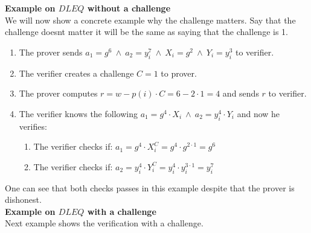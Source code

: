 \noindent
\textbf{Example on $DLEQ$ without a challenge}\\
We will now show a concrete example why the challenge matters. Say that the challenge doesnt matter it will be the same as saying that the challenge is 1. 


\begin{enumerate}
    \item The prover sends \begin{math}a_1=g^6 \ \land\ a_2=y_i^7 \ \land \ X_i=g^2 \ \land \ Y_i=y_i^3 \end{math} to verifier.
    \item The verifier creates a challenge \begin{math}C=1 \end{math} to prover.
    \item The prover computes \begin{math}r=w-p(i)  \cdot  C = 6-2  \cdot  1= 4\end{math} and sends $r$ to verifier.
    \item The verifier knows the following  \begin{math}a_1=g^4  \cdot  X_i \ \land \ a_2=y_i^4  \cdot  Y_i \end{math} and now he verifies:
    \begin{enumerate}        
        \item The verifier checks if:  \begin{math}a_1 = g^4 \cdot X_i^C = g^4 \cdot g^{2 \cdot 1} = g^6\end{math}
        \item The verifier checks if:  \begin{math} a_2=y_i^4  \cdot  Y_i^C = y_i^4  \cdot  y_i^{3 \cdot 1}= y_i^7 \end{math}
    \end{enumerate}
\end{enumerate}


\noindent
One can see that both checks passes in this example despite that the prover is dishonest. \\

\noindent
\textbf{Example on $DLEQ$ with a challenge}\\
Next example shows the verification with a challenge.

